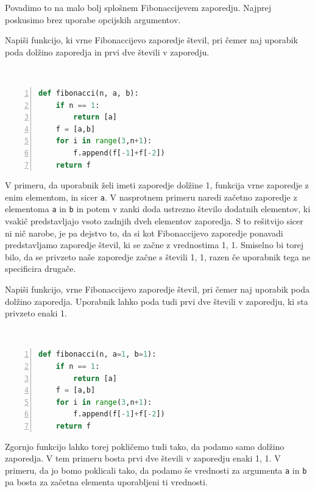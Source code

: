 Povadimo to na malo bolj splošnem Fibonaccijevem zaporedju. Najprej poskusimo brez uporabe opcijskih argumentov.
\begin{zgled}
Napiši funkcijo, ki vrne Fibonaccijevo zaporedje števil, pri čemer naj uporabik poda dolžino zaporedja in prvi dve števili v zaporedju.
\end{zgled}
\begin{resitev} \  
\begin{lstlisting}[language=Python,numbers=left]
def fibonacci(n, a, b):
    if n == 1:
        return [a]
    f = [a,b]
    for i in range(3,n+1):
        f.append(f[-1]+f[-2])
    return f
\end{lstlisting}
\end{resitev}
V primeru, da uporabnik želi imeti zaporedje dolžine 1, funkcija vrne zaporedje z enim elementom, in sicer \texttt{a}. V nasprotnem primeru naredi začetno zaporedje z elementoma \texttt{a} in \texttt{b} in potem v zanki doda ustrezno število dodatnih elementov, ki vsakič predstavljajo vsoto zadnjih dveh elementov zaporedja. S to rešitvijo sicer ni nič narobe, je pa dejstvo to, da si kot Fibonaccijevo zaporedje ponavadi predstavljamo zaporedje števil, ki se začne z vrednostima 1, 1. Smiselno bi torej bilo, da se privzeto naše zaporedje začne s števili 1, 1, razen če uporabnik tega ne specificira drugače. 
\begin{zgled}
Napiši funkcijo, vrne Fibonaccijevo zaporedje števil, pri čemer naj uporabik poda dolžino zaporedja. Uporabnik lahko poda tudi prvi dve števili v zaporedju, ki sta privzeto enaki 1.
\end{zgled}
\begin{resitev} \  
\begin{lstlisting}[language=Python,numbers=left]
def fibonacci(n, a=1, b=1):
    if n == 1:
        return [a]
    f = [a,b]
    for i in range(3,n+1):
        f.append(f[-1]+f[-2])
    return f
\end{lstlisting}
\end{resitev}
Zgornjo funkcijo lahko torej pokličemo tudi tako, da podamo samo dolžino zaporedja. V tem primeru bosta prvi dve števili v zaporedju enaki 1, 1. V primeru, da jo bomo poklicali tako, da podamo še vrednosti za argumenta \texttt{a} in \texttt{b} pa bosta za začetna elementa uporabljeni ti vrednosti.